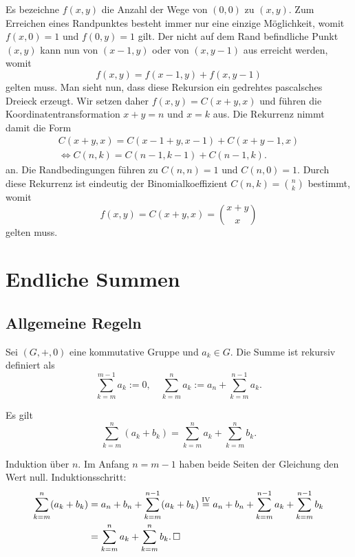 \begin{Beweis}[Beweis 2]
Es bezeichne $f(x,y)$ die Anzahl der Wege von $(0,0)$
zu $(x,y)$. Zum Erreichen eines Randpunktes besteht immer nur eine
einzige Möglichkeit, womit $f(x,0)=1$ und $f(0,y)=1$ gilt. Der nicht
auf dem Rand befindliche Punkt $(x,y)$ kann nun von $(x-1,y)$ oder von
$(x,y-1)$ aus erreicht werden, womit
\[f(x,y) = f(x-1,y) + f(x,y-1)\]
gelten muss. Man sieht nun, dass diese Rekursion ein gedrehtes
pascalsches Dreieck erzeugt. Wir setzen daher $f(x,y) = C(x+y,x)$ und
führen die Koordinatentransformation $x+y=n$ und $x=k$ aus. Die
Rekurrenz nimmt damit die Form
\begin{gather*}
C(x+y,x) = C(x-1+y,x-1) + C(x+y-1,x)\\
\iff C(n,k) = C(n-1,k-1) + C(n-1,k).
\end{gather*}
an. Die Randbedingungen führen zu $C(n,n)=1$ und $C(n,0)=1$. Durch diese
Rekurrenz ist eindeutig der Binomialkoeffizient $C(n,k)=\binom{n}{k}$
bestimmt, womit
\[f(x,y) = C(x+y,x) = \binom{x+y}{x}\]
gelten muss.\,\qedsymbol
\end{Beweis}

\newpage
\section{Endliche Summen}

\subsection{Allgemeine Regeln}

\begin{Definition}[Summe]
Sei $(G,+,0)$ eine kommutative Gruppe und $a_k\in G$. Die Summe ist
rekursiv definiert als
\[\sum_{k=m}^{m-1} a_k := 0,\quad \sum_{k=m}^n a_k
:= a_n + \sum_{k=m}^{n-1} a_k.\]
\end{Definition}

\begin{Korollar}\label{sum-add}
Es gilt
\[\sum_{k=m}^n (a_k + b_k) = \sum_{k=m}^n a_k + \sum_{k=m}^n b_k.\]
\end{Korollar}
\begin{Beweis} Induktion über $n$. Im Anfang $n=m-1$ haben
beide Seiten der Gleichung den Wert null. Induktionsschritt:
\begin{align*}
\sum_{k=m}^n (a_k+b_k) &= a_n + b_n + \sum_{k=m}^{n-1} (a_k+b_k)
\stackrel{\mathrm{IV}}= a_n + b_n + \sum_{k=m}^{n-1} a_k + \sum_{k=m}^{n-1} b_k\\
&= \sum_{k=m}^n a_k + \sum_{k=m}^n b_k.\,\square
\end{align*}
\end{Beweis}

